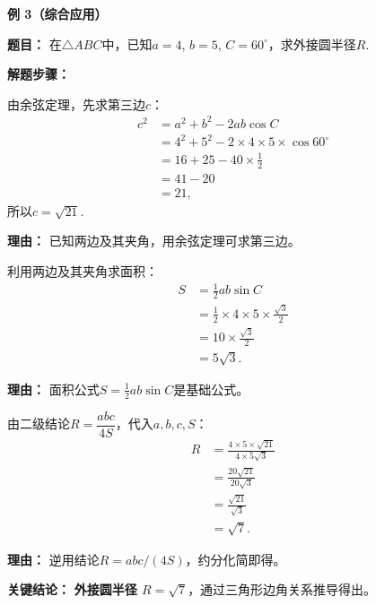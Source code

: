 \begin{examplebox}
	\medskip
	\textbf{\textcolor{CExample}{例 3（综合应用）}}

	\textbf{\textcolor{CExample}{题目：}}
	在$\triangle ABC$中，已知$a=4$, $b=5$, $C=60^\circ$，求外接圆半径$R$.

	\textbf{\textcolor{CExample}{解题步骤：}}
	\begin{description}[style=nextline, leftmargin=2.8em, labelsep=0.5em, itemsep=0.45em]
		\item[\textbf{第一步（余弦求边）：}] 由余弦定理，先求第三边$c$：
			\[
				\begin{aligned}
					c^2 &= a^2+b^2-2ab\cos C \\
					&= 4^2+5^2-2\times4\times5\times\cos60^\circ \\
					&= 16+25-40\times\frac12 \\
					&= 41-20 \\
					&= 21,
			\end{aligned}
			\]
			所以$c = \sqrt{21}$.
			\par\textbf{理由：} 已知两边及其夹角，用余弦定理可求第三边。
		\item[\textbf{第二步（面积公式）：}] 利用两边及其夹角求面积：
			\[
				\begin{aligned}
					S &= \frac12 ab\sin C \\
					&= \frac12\times4\times5\times\frac{\sqrt3}{2} \\
					&= 10\times\frac{\sqrt3}{2} \\
					&= 5\sqrt3.
			\end{aligned}
			\]
			\par\textbf{理由：} 面积公式$S=\frac12 ab\sin C$是基础公式。
		\item[\textbf{第三步（半径求解）：}] 由二级结论$R = \dfrac{abc}{4S}$，代入$a,b,c,S$：
			\[
				\begin{aligned}
					R &= \frac{4\times5\times\sqrt{21}}{4\times5\sqrt3} \\
					&= \frac{20\sqrt{21}}{20\sqrt3} \\
					&= \frac{\sqrt{21}}{\sqrt3} \\
					&= \sqrt7.
			\end{aligned}
			\]
			\par\textbf{理由：} 逆用结论$R=abc/(4S)$，约分化简即得。
	\end{description}
	\textbf{\textcolor{CExample}{关键结论：}}
	\textbf{外接圆半径 $R=\sqrt7$}，通过三角形边角关系推导得出。
\end{examplebox}
